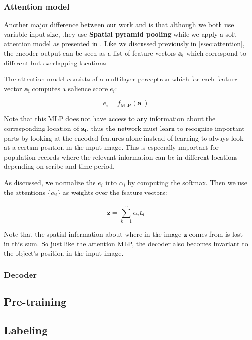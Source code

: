 \subsubsection{Attention model}

Another major difference between our work and \cite{FornesCnnCategorization} is that although we both use variable input size, they use \textbf{Spatial pyramid pooling} while we apply a soft attention model as presented in \cite{AttendAndTell}. Like we discussed previously in \ref{ssec:attention}, the encoder output can be seen as a list of feature vectors $\mathbf{a_i}$ which correspond to different but overlapping locations.

The attention model consists of a multilayer perceptron which for each feature vector $\mathbf{a_i}$ computes a salience score $e_i$:

\[
e_i = f_\text{MLP}(\mathbf{a_i})
\]

Note that this MLP does not have access to any information about the corresponding location of $\mathbf{a_i}$, thus the network must learn to recognize important parts by looking at the encoded features alone instead of learning to always look at a certain position in the input image. This is especially important for population records where the relevant information can be in different locations depending on scribe and time period.

As discussed, we normalize the $e_i$ into $\alpha_i$ by computing the softmax. Then we use the attentions $\{\alpha_i\}$ as weights over the feature vectors:

\[
\mathbf{z} = \sum_{k=1}^L \alpha_i \mathbf{a_i}
\]

Note that the spatial information about where in the image $\mathbf{z}$ comes from is lost in this sum. So just like the attention MLP, the decoder also becomes invariant to the object's position in the input image.

\subsubsection{Decoder}





\subsection{Pre-training}
\subsection{Labeling}
